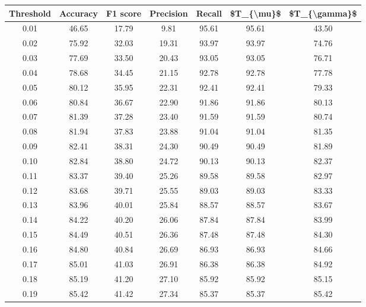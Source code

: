 \begin{tabular}{|c|c|c|c|c|c|c|}
\hline
 Threshold &  Accuracy &  F1 score &  Precision &  Recall &  \$T\_\{\textbackslash mu\}\$ &  \$T\_\{\textbackslash gamma\}\$ \\
\hline
      0.01 &     46.65 &     17.79 &       9.81 &   95.61 &      95.61 &         43.50 \\
      0.02 &     75.92 &     32.03 &      19.31 &   93.97 &      93.97 &         74.76 \\
      0.03 &     77.69 &     33.50 &      20.43 &   93.05 &      93.05 &         76.71 \\
      0.04 &     78.68 &     34.45 &      21.15 &   92.78 &      92.78 &         77.78 \\
      0.05 &     80.12 &     35.95 &      22.31 &   92.41 &      92.41 &         79.33 \\
      0.06 &     80.84 &     36.67 &      22.90 &   91.86 &      91.86 &         80.13 \\
      0.07 &     81.39 &     37.28 &      23.40 &   91.59 &      91.59 &         80.74 \\
      0.08 &     81.94 &     37.83 &      23.88 &   91.04 &      91.04 &         81.35 \\
      0.09 &     82.41 &     38.31 &      24.30 &   90.49 &      90.49 &         81.89 \\
      0.10 &     82.84 &     38.80 &      24.72 &   90.13 &      90.13 &         82.37 \\
      0.11 &     83.37 &     39.40 &      25.26 &   89.58 &      89.58 &         82.97 \\
      0.12 &     83.68 &     39.71 &      25.55 &   89.03 &      89.03 &         83.33 \\
      0.13 &     83.96 &     40.01 &      25.84 &   88.57 &      88.57 &         83.67 \\
      0.14 &     84.22 &     40.20 &      26.06 &   87.84 &      87.84 &         83.99 \\
      0.15 &     84.49 &     40.51 &      26.36 &   87.48 &      87.48 &         84.30 \\
      0.16 &     84.80 &     40.84 &      26.69 &   86.93 &      86.93 &         84.66 \\
      0.17 &     85.01 &     41.03 &      26.91 &   86.38 &      86.38 &         84.92 \\
      0.18 &     85.19 &     41.20 &      27.10 &   85.92 &      85.92 &         85.15 \\
      0.19 &     85.42 &     41.42 &      27.34 &   85.37 &      85.37 &         85.42 \\

\end{tabular}
